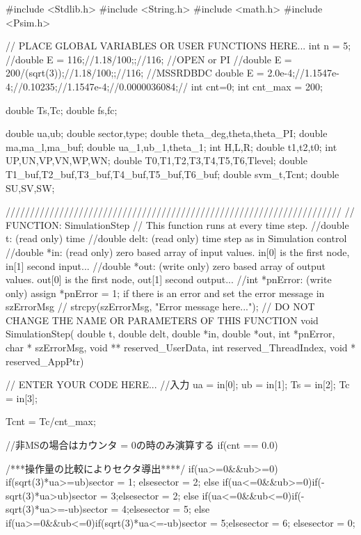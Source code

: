 
\begin{mylisting}[language=c,caption=SVPWMモジュール,label=hurokuB_SVPWM]

#include <Stdlib.h>
#include <String.h>
#include <math.h>
#include <Psim.h>

// PLACE GLOBAL VARIABLES OR USER FUNCTIONS HERE...
int n = 5;
//double E = 116;//1.18/100;;//116;
//OPEN or PI
//double E = 200/(sqrt(3));//1.18/100;;//116;
//MSSRDBDC
double E = 2.0e-4;//1.1547e-4;//0.10235;//1.1547e-4;//0.0000036084;//
int cnt=0;
int cnt_max = 200;

double Ts,Tc;
double fs,fc;

double ua,ub;
double sector,type;
double theta_deg,theta,theta_PI;
double ma,ma_l,ma_buf;
double ua_1,ub_1,theta_1;
int H,L,R;
double t1,t2,t0;
int UP,UN,VP,VN,WP,WN;
double T0,T1,T2,T3,T4,T5,T6,Tlevel;
double T1_buf,T2_buf,T3_buf,T4_buf,T5_buf,T6_buf;
double svm_t,Tcnt;
double SU,SV,SW;


/////////////////////////////////////////////////////////////////////
// FUNCTION: SimulationStep
//   This function runs at every time step.
//double t: (read only) time
//double delt: (read only) time step as in Simulation control
//double *in: (read only) zero based array of input values. in[0] is the first node, in[1] second input...
//double *out: (write only) zero based array of output values. out[0] is the first node, out[1] second output...
//int *pnError: (write only)  assign  *pnError = 1;  if there is an error and set the error message in szErrorMsg
//    strcpy(szErrorMsg, "Error message here..."); 
// DO NOT CHANGE THE NAME OR PARAMETERS OF THIS FUNCTION
void SimulationStep(
		double t, double delt, double *in, double *out,
		 int *pnError, char * szErrorMsg,
		 void ** reserved_UserData, int reserved_ThreadIndex, void * reserved_AppPtr)
{
// ENTER YOUR CODE HERE...
//入力
ua = in[0];
ub = in[1];
Ts = in[2];
Tc = in[3];

Tcnt = Tc/cnt_max;

//非MSの場合はカウンタ = 0の時のみ演算する
if(cnt == 0.0){

/***操作量の比較によりセクタ導出****/
if(ua>=0&&ub>=0)
{if(sqrt(3)*ua>=ub){sector = 1;	}else{sector = 2;}
}else if(ua<=0&&ub>=0){if(-sqrt(3)*ua>ub){sector = 3;}else{sector = 2;}
}else if(ua<=0&&ub<=0){if(-sqrt(3)*ua>=-ub){sector = 4;}else{sector = 5;}
}else if(ua>=0&&ub<=0){if(sqrt(3)*ua<=-ub){sector = 5;}else{sector = 6;}
}else{sector = 0;}

}}
\end{mylisting}
